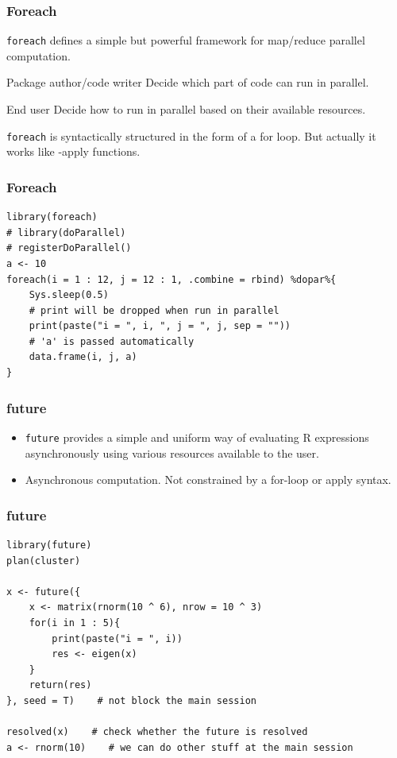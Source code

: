 \documentclass[aspectratio=169,xcolor={dvipsnames,table}]{beamer}
\begin{document}
\begin{frame}[fragile]
  \frametitle{Foreach}
  \texttt{foreach} defines a simple but powerful framework for map/reduce parallel computation.
  \begin{block}{Package author/code writer}
    Decide {\color{Brown}which part of code} can run in parallel.
  \end{block}
  \begin{block}{End user}
    Decide {\color{Brown}how} to run in parallel based on their available resources.
  \end{block}
  \texttt{foreach} is syntactically structured in the form of a for loop. But actually it works like {\color{red}-apply} functions.
\end{frame}

\begin{frame}[fragile]
  \frametitle{Foreach}
\begin{verbatim}
library(foreach)
# library(doParallel)
# registerDoParallel()
a <- 10
foreach(i = 1 : 12, j = 12 : 1, .combine = rbind) %dopar%{
    Sys.sleep(0.5)
    # print will be dropped when run in parallel
    print(paste("i = ", i, ", j = ", j, sep = ""))
    # 'a' is passed automatically
    data.frame(i, j, a)
}
\end{verbatim}
\end{frame}

\begin{frame}[fragile]
  \frametitle{future}
  \begin{itemize}
  \item \texttt{future} provides a simple and uniform way of evaluating R expressions asynchronously using various resources available to the user.
  \item Asynchronous computation. Not constrained by a for-loop or apply syntax.
    \end{itemize}
  \end{frame}


\begin{frame}[fragile]
  \frametitle{future}
\begin{verbatim}
library(future)
plan(cluster)

x <- future({
    x <- matrix(rnorm(10 ^ 6), nrow = 10 ^ 3)
    for(i in 1 : 5){
        print(paste("i = ", i))
        res <- eigen(x) 
    }
    return(res)
}, seed = T)    # not block the main session

resolved(x)    # check whether the future is resolved
a <- rnorm(10)    # we can do other stuff at the main session
\end{verbatim}
\end{frame}
\end{document}
